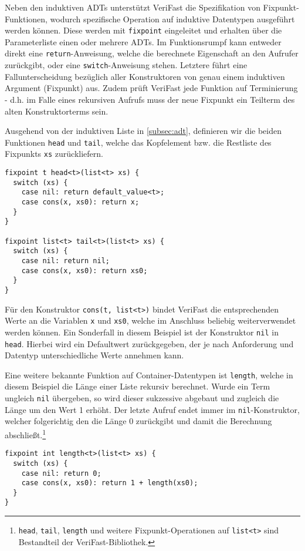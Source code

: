 Neben den induktiven ADTs unterstützt VeriFast die Spezifikation von Fix\-punkt-Funktionen, wodurch spezifische Operation auf induktive Datentypen ausgeführt werden können. Diese werden mit \texttt{fixpoint} eingeleitet und erhalten über die Parameterliste einen oder mehrere ADTs. Im Funktionsrumpf kann entweder direkt eine \texttt{return}-Anweisung, welche die berechnete Eigenschaft an den Aufrufer zurückgibt, oder eine \texttt{switch}-Anweisung stehen. Letztere führt eine Fallunterscheidung bezüglich aller Konstruktoren von genau einem induktiven Argument (Fixpunkt) aus. Zudem prüft VeriFast jede Funktion auf Terminierung - d.h. im Falle eines rekursiven Aufrufs muss der neue Fixpunkt ein Teilterm des alten Konstruktorterms sein. \cite{Jacobs2010}

Ausgehend von der induktiven Liste in \cref{subsec:adt}, definieren wir die beiden Funktionen \texttt{head} und \texttt{tail}, welche das Kopfelement bzw. die Restliste des Fixpunkts \texttt{xs} zurückliefern.

\begin{lstlisting}
fixpoint t head<t>(list<t> xs) {
  switch (xs) {
    case nil: return default_value<t>;
    case cons(x, xs0): return x;
  }
}

fixpoint list<t> tail<t>(list<t> xs) {
  switch (xs) {
    case nil: return nil;
    case cons(x, xs0): return xs0;
  }
}
\end{lstlisting}

\noindent
Für den Konstruktor \texttt{cons(t, list<t>)} bindet VeriFast die entsprechenden Werte an die Variablen \texttt{x} und \texttt{xs0}, welche im Anschluss beliebig weiterverwendet werden können. Ein Sonderfall in diesem Beispiel ist der Konstruktor \texttt{nil} in \texttt{head}. Hierbei wird ein Defaultwert zurückgegeben, der je nach Anforderung und Datentyp unterschiedliche Werte annehmen kann.

Eine weitere bekannte Funktion auf Container-Datentypen ist \texttt{length}, welche in diesem Beispiel die Länge einer Liste rekursiv berechnet. Wurde ein Term ungleich \texttt{nil} übergeben, so wird dieser sukzessive abgebaut und zugleich die Länge um den Wert 1 erhöht. Der letzte Aufruf endet immer im \texttt{nil}-Konstruktor, welcher folgerichtig den die Länge 0 zurückgibt und damit die Berechnung abschließt.\footnote{\texttt{head}, \texttt{tail}, \texttt{length} und weitere Fixpunkt-Operationen auf \texttt{list<t>} sind Bestandteil der VeriFast-Bibliothek.}

\begin{lstlisting}
fixpoint int length<t>(list<t> xs) {
  switch (xs) {
    case nil: return 0;
    case cons(x, xs0): return 1 + length(xs0);
  }
}
\end{lstlisting}

